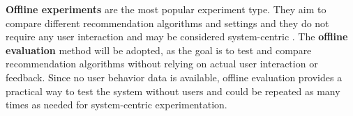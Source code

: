 \documentclass[\myFontSize,a4paper,oneside,english,hidelinks]{article}
\begin{document}
%
%
\textbf{Offline experiments} are the most popular experiment type. They aim to compare different recommendation algorithms and settings and they do not require any user interaction and may be considered system-centric \cite{Zangerle2023}. 
The \textbf{offline evaluation} method will be adopted, as the goal is to test and compare recommendation algorithms without relying on actual user interaction or feedback. Since no user behavior data is available, offline evaluation provides a practical way to test the system without users
and could be repeated as many times as needed for system-centric experimentation.
%
%
%
%
\end{document}
